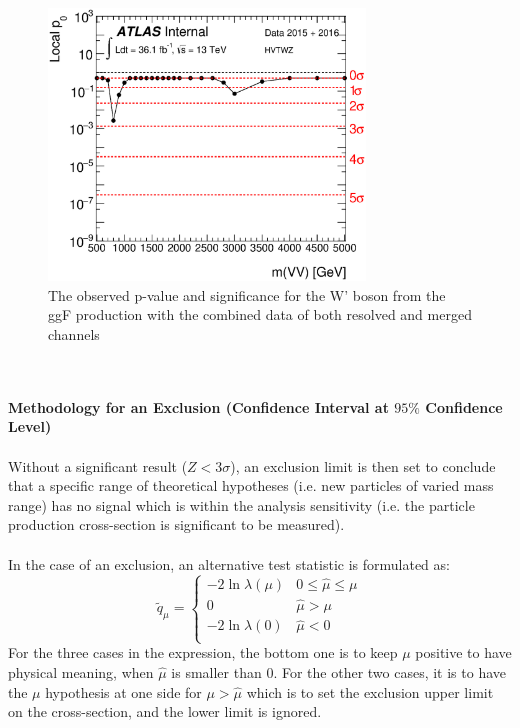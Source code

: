 \begin{figure}
	\includegraphics[width=0.75\textwidth]{Chapter4/VVM_p0_HVTWZ_ggF.eps}
	\caption{The observed p-value and significance for the W' boson from the ggF production with the combined data of both resolved and merged channels }
	\label{Fig:pvalue_hvt}
\end{figure}
\noindent
\\
\\{\bf Methodology for an Exclusion (Confidence Interval at $95\%$ Confidence Level)}
\\
\\Without a significant result ($Z<3\sigma$), an exclusion limit is then set to conclude that a specific range of theoretical hypotheses (i.e. new particles of varied mass range) has no signal which is within the analysis sensitivity (i.e. the particle production cross-section is significant to be measured). 
\\
\\In the case of an exclusion, an alternative test statistic is formulated as:
\begin{equation}
\tilde{q}_{\mu} = 
\begin{cases}
-2 \ln \lambda(\mu) & 0 \le \hat{\mu} \le \mu \\
0 & \hat{\mu} > \mu \\
-2 \ln \lambda(0) & \hat{\mu} < 0 \\
\end{cases}
\label{Eq:Sig_testQ}
\end{equation}
For the three cases in the expression, the bottom one is to keep $\mu$ positive to have physical meaning, when $\hat{\mu}$ is smaller than 0. For the other two cases, it is to have the $\mu$ hypothesis at one side for $\mu>\hat{\mu}$ which is to set the exclusion upper limit on the cross-section, and the lower limit is ignored. 
